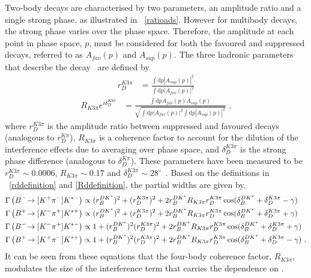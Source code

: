 Two-body \decay{\D}{\Kmp\pipm} decays are characterised by two parameters, an amplitude ratio and a single strong phase, as illustrated in \eqn~\ref{ratioads}. However for multibody \decay{\D}{\Kmp\pipm\pimp\pipm} decays, the strong phase varies over the phase space. Therefore, the amplitude at each point in phase space, $p$, must be considered for both the \decay{\D}{\Km\pip\pim\pip} favoured and \decay{\Dz}{\Kp\pim\pip\pim} suppressed decays, referred to as $A_{fav}(p)$ and $A_{sup}(p)$. The three hadronic parameters that describe the \decay{\D}{\Km\pip\pim\pip} decay~\cite{charmk3pi,charmk3pi_errata,LHCb-PAPER-2015-057} are defined by
\begin{align}
r_D^{K3\pi} &= \frac{\int \mathrm{d}p \left|A_{sup}(p)\right|^2}{\int \mathrm{d}p \left|A_{fav}(p)\right|^2}
\label{rddefinition}
\end{align}
\begin{align}
R_{K3\pi} e^{i\delta_D^{K3\pi}} &= \frac{\int \mathrm{d}p A_{fav}(p)A_{sup}(p)}{\sqrt{\int \mathrm{d}p \left|A_{fav}(p)\right|^2 \int \mathrm{d}p \left|A_{sup}(p)\right|^2}} \text { ,}
\label{Rddefinition}
\end{align}
where $r_D^{K3\pi}$ is the amplitude ratio between suppressed and favoured \decay{\D}{\Km\pip\pim\pip} decays (analogous to $r_D^{K\pi}$), $R_{K3\pi}$ is a coherence factor to account for the dilution of the interference effects due to averaging over phase space, and $\delta_D^{K3\pi}$ is the strong phase difference (analogous to $\delta_D^{K\pi}$). These parameters have been measured to be $r_D^{K3\pi} \sim 0.0006$, $R_{K3\pi} \sim 0.17$ and $\delta_D^{K3\pi} \sim 28^{\circ}$~\cite{charmk3pi,charmk3pi_errata,LHCb-PAPER-2015-057}. Based on the definitions in \eqn~\ref{rddefinition} and \ref{Rddefinition}, the partial widths are given by,
\begin{align}
\Gamma\left({{{B}^-}}\!\rightarrow [{{K}^+}{{\pi}^-}]{\ensuremath{{K}^{*-}}}\right) &\propto (r_B^{DK^*})^2 + (r_D^{K3\pi})^2 + 2r_B^{DK^*}R_{K3\pi}r_D^{K3\pi}\cos(\delta_B^{DK^*} + \delta_D^{K3\pi} - \gamma) \label{adsBdecaym4body} \\
\Gamma\left({{{B}^+}}\!\rightarrow [{{K}^-}{{\pi}^+}]{\ensuremath{{K}^{*+}}}\right) &\propto (r_B^{DK^*})^2 + (r_D^{K3\pi})^2 + 2r_B^{DK^*}R_{K3\pi}r_D^{K3\pi}\cos(\delta_B^{DK^*} + \delta_D^{K3\pi} + \gamma) \label{adsBdecayp4body} \\
\Gamma\left({{{B}^-}}\!\rightarrow [{{K}^-}{{\pi}^+}]{\ensuremath{{K}^{*-}}}\right) &\propto 1 + (r_B^{DK^*})^2(r_D^{K3\pi})^2 + 2r_B^{DK^*}R_{K3\pi}r_D^{K3\pi}\cos(\delta_B^{DK^*} + \delta_D^{K3\pi} + \gamma) \label{favBdecaym4body} \\
\Gamma\left({{{B}^+}}\!\rightarrow [{{K}^+}{{\pi}^-}]{\ensuremath{{K}^{*+}}}\right) &\propto 1 + (r_B^{DK^*})^2(r_D^{K3\pi})^2 + 2r_B^{DK^*}R_{K3\pi}r_D^{K3\pi}\cos(\delta_B^{DK^*} + \delta_D^{K3\pi} - \gamma) \text{ .}\label{favBdecayp4body} 
\end{align}
It can be seen from these equations that the four-body coherence factor, $R_{K3\pi}$, modulates the size of the interference term that carries the dependence on \Pgamma.

